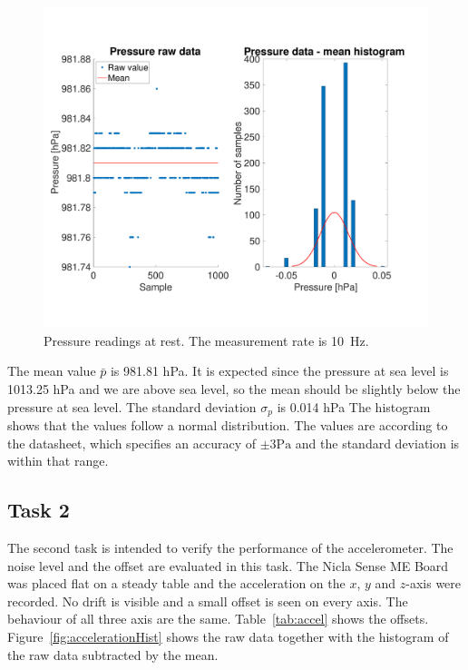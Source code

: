 \documentclass[DIV=14]{scrartcl}
\begin{document}
    \begin{figure}[h]
        \centering
        \includegraphics[width=.6\textwidth]{plots/plotPressure}
        \caption{Pressure readings at rest. The measurement rate is \SI{10}{\hertz}.}
        \label{fig:plotPressure}
    \end{figure}

    The mean value $\bar{p}$ is 981.81 \si{\hecto\pascal}.
    It is expected since the pressure at sea level is 1013.25 \si{\hecto\pascal} and we are above sea level,
    so the mean should be slightly below the pressure at sea level.
    The standard deviation $\sigma_p$ is 0.014 \si{\hecto\pascal}
    The histogram shows that the values follow a normal distribution.
    The values are according to the datasheet, which specifies an accuracy of $\pm3 \si{\pascal}$ and
    the standard deviation is within that range.

    \subsection*{Task 2}

    The second task is intended to verify the performance of the accelerometer.
    The noise level and the offset are evaluated in this task.
    The Nicla Sense ME Board was placed flat on a steady table and the acceleration on the $x$, $y$ and $z$-axis were recorded.
    No drift is visible and a small offset is seen on every axis.
    The behaviour of all three axis are the same.
    Table~\ref{tab:accel} shows the offsets.
    Figure~\ref{fig:accelerationHist} shows the raw data together with the histogram of the raw data subtracted by the mean.
\end{document}
